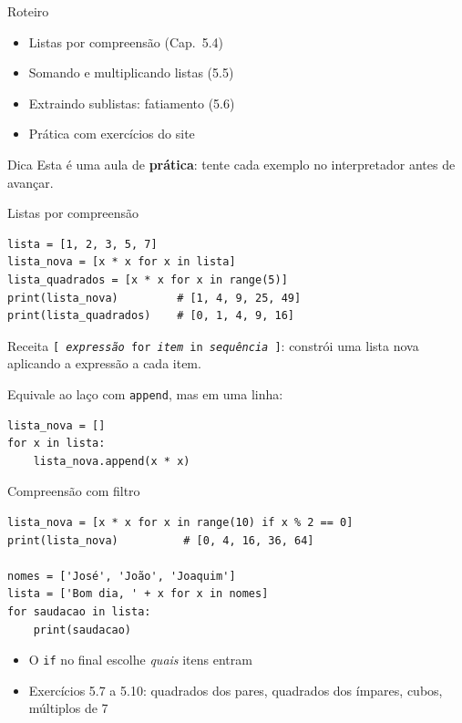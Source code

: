 \documentclass[aspectratio=169,10pt,t]{beamer}
\begin{document}
\capa

\begin{frame}{Roteiro}
  \begin{itemize}
    \item Listas por compreensão (Cap.~5.4)
    \item Somando e multiplicando listas (5.5)
    \item Extraindo sublistas: fatiamento (5.6)
    \item Prática com exercícios do site
  \end{itemize}
  \vspace{1ex}
  \begin{block}{Dica}
    Esta é uma aula de \textbf{prática}: tente cada exemplo no interpretador antes de avançar.
  \end{block}
\end{frame}

\begin{frame}[fragile]{Listas por compreensão}
\begin{lstlisting}[basicstyle=\ttfamily\scriptsize]
lista = [1, 2, 3, 5, 7]
lista_nova = [x * x for x in lista]
lista_quadrados = [x * x for x in range(5)]
print(lista_nova)         # [1, 4, 9, 25, 49]
print(lista_quadrados)    # [0, 1, 4, 9, 16]
\end{lstlisting}
  \begin{block}{Receita}
    \texttt{[ \emph{expressão} for \emph{item} in \emph{sequência} ]}: constrói uma lista nova aplicando a expressão a cada item.
  \end{block}
  Equivale ao laço com \texttt{append}, mas em uma linha:
\begin{lstlisting}[basicstyle=\ttfamily\scriptsize]
lista_nova = []
for x in lista:
    lista_nova.append(x * x)
\end{lstlisting}
\end{frame}

\begin{frame}[fragile]{Compreensão com filtro}
\begin{lstlisting}
lista_nova = [x * x for x in range(10) if x % 2 == 0]
print(lista_nova)          # [0, 4, 16, 36, 64]

nomes = ['José', 'João', 'Joaquim']
lista = ['Bom dia, ' + x for x in nomes]
for saudacao in lista:
    print(saudacao)
\end{lstlisting}
  \begin{itemize}
    \item O \texttt{if} no final escolhe \emph{quais} itens entram
    \item Exercícios 5.7 a 5.10: quadrados dos pares, quadrados dos ímpares, cubos, múltiplos de 7
  \end{itemize}
\end{frame}
\end{document}
